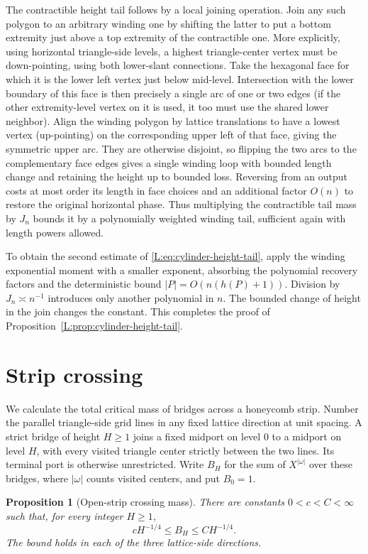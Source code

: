 \documentclass[11pt]{article}
\numberwithin{equation}{section}
\newtheorem{proposition}[theorem]{Proposition}
\theoremstyle{definition}\newtheorem{definition}[theorem]{Definition}
\theoremstyle{remark}\newtheorem{remark}[theorem]{Remark}
\begin{document}
The contractible height tail follows by a local joining operation. Join any such polygon to an arbitrary winding one by shifting the latter to put a bottom extremity just above a top extremity of the contractible one. More explicitly, using horizontal triangle-side levels, a highest triangle-center vertex must be down-pointing, using both lower-slant connections. Take the hexagonal face for which it is the lower left vertex just below mid-level. Intersection with the lower boundary of this face is then precisely a single arc of one or two edges (if the other extremity-level vertex on it is used, it too must use the shared lower neighbor). Align the winding polygon by lattice translations to have a lowest vertex (up-pointing) on the corresponding upper left of that face, giving the symmetric upper arc. They are otherwise disjoint, so flipping the two arcs to the complementary face edges gives a single winding loop with bounded length change and retaining the height up to bounded loss. Reversing from an output costs at most order its length in face choices and an additional factor \(O(n)\) to restore the original horizontal phase. Thus multiplying the contractible tail mass by \(J_n\) bounds it by a polynomially weighted winding tail, sufficient again with length powers allowed.


To obtain the second estimate of
\eqref{L:eq:cylinder-height-tail}, apply the winding exponential moment
with a smaller exponent, absorbing the polynomial recovery factors and
the deterministic bound $|P|=O(n(h(P)+1))$. Division by
$J_n\asymp n^{-1}$ introduces only another polynomial in $n$.
The bounded change of height in the join changes the constant.
This completes the proof of Proposition~\ref{L:prop:cylinder-height-tail}.

\section{Strip crossing}\label{L:part6}

We calculate the total critical mass of bridges across a honeycomb strip.
Number the parallel triangle-side grid lines in any fixed lattice direction
at unit spacing. A strict bridge of height $H\ge1$ joins a fixed midport on
level $0$ to a midport on level $H$, with every visited triangle center
strictly between the two lines. Its terminal port is otherwise unrestricted.
Write $B_H$ for the sum of $X^{|\omega|}$ over these bridges, where
$|\omega|$ counts visited centers, and put $B_0=1$.

\begin{proposition}[Open-strip crossing mass]\label{L:prop:strip-mass}
There are constants $0<c<C<\infty$ such that, for every integer $H\ge1$,
\[
 cH^{-1/4}\le B_H\le CH^{-1/4}.
\]
The bound holds in each of the three lattice-side directions.
\end{proposition}
\end{document}
